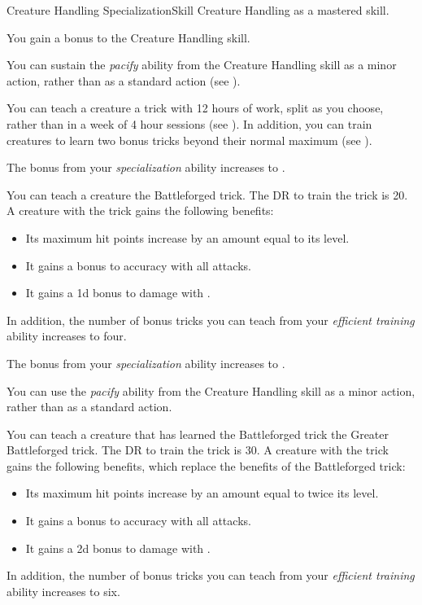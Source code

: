     \begin{feat}{Creature Handling Specialization}{Skill}
        \featpre Creature Handling as a mastered skill.

         You gain a  bonus to the Creature Handling skill.

         You can sustain the \textit{pacify} ability from the Creature Handling skill as a minor action, rather than as a standard action (see ).

         You can teach a creature a trick with 12 hours of work, split as you choose, rather than in a week of 4 hour sessions (see ).
        In addition, you can train creatures to learn two bonus tricks beyond their normal maximum (see ).

         The bonus from your \textit{specialization} ability increases to .

         You can teach a creature the Battleforged trick.
        The DR to train the trick is 20.
        A creature with the trick gains the following benefits:
        \begin{itemize}
            \item Its maximum hit points increase by an amount equal to its level.
            \item It gains a  bonus to accuracy with all attacks.
            \item It gains a \plus1d bonus to damage with .
        \end{itemize}
        In addition, the number of bonus tricks you can teach from your \textit{efficient training} ability increases to four.

         The bonus from your \textit{specialization} ability increases to .

         You can use the \textit{pacify} ability from the Creature Handling skill as a minor action, rather than as a standard action.

         You can teach a creature that has learned the Battleforged trick the Greater Battleforged trick.
        The DR to train the trick is 30.
        A creature with the trick gains the following benefits, which replace the benefits of the Battleforged trick:
        \begin{itemize}
            \item Its maximum hit points increase by an amount equal to twice its level.
            \item It gains a  bonus to accuracy with all attacks.
            \item It gains a \plus2d bonus to damage with .
        \end{itemize}
        In addition, the number of bonus tricks you can teach from your \textit{efficient training} ability increases to six.
    \end{feat}

